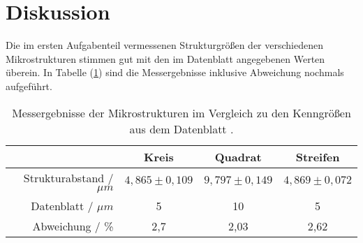 \section{Diskussion}
\label{sec:Diskussion}
Die im ersten Aufgabenteil vermessenen Strukturgr\"o{\ss}en der verschiedenen Mikrostrukturen stimmen gut mit den im Datenblatt angegebenen Werten \"uberein.
In Tabelle (\ref{tab:auf1_disk}) sind die Messergebnisse inklusive Abweichung nochmals aufgef\"uhrt.

\begin{table}
	\centering
	\caption{Messergebnisse der Mikrostrukturen im Vergleich zu den Kenngr\"o{\ss}en aus dem Datenblatt \cite{anleitung}.}
\begin{tabular}{|r|ccc|}
	\hline
	{} & {Kreis} & {Quadrat} & {Streifen} \\
	\hline
	Strukturabstand / $\mu m$ & $4,865 \pm 0,109$ & $ 9,797 \pm 0,149$ & $4,869 \pm 0,072$ \\
	Datenblatt / $\mu m$ & 5 & 10 & 5 \\
	Abweichung / \%	& 2,7 & 2,03 & 2,62 \\
	\hline
\end{tabular}
\label{tab:auf1_disk}
\end{table}

